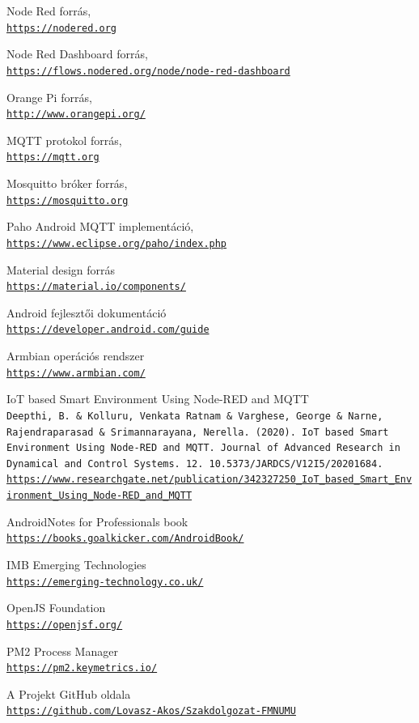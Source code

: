 \documentclass[
]{thesis-ekf}
\theoremstyle{definition}
\theoremstyle{remark}
\begin{document}
\begin{thebibliography}{2}
Node Red forrás,
\\\texttt{\url{https://nodered.org}}

Node Red Dashboard forrás,
\\\texttt{\url{https://flows.nodered.org/node/node-red-dashboard}}

Orange Pi forrás,
\\\texttt{\url{http://www.orangepi.org/}}

MQTT protokol forrás,
\\\texttt{\url{https://mqtt.org}}

Mosquitto bróker forrás,
\\\texttt{\url{https://mosquitto.org}}

Paho Android MQTT implementáció,
\\\texttt{\url{https://www.eclipse.org/paho/index.php}}

Material design forrás
\\\texttt{\url{https://material.io/components/}}

Android fejlesztői dokumentáció
\\\texttt{\url{https://developer.android.com/guide}}

Armbian operációs rendszer
\\\texttt{\url{https://www.armbian.com/}}

IoT based Smart Environment Using Node-RED and MQTT
\\\texttt{Deepthi, B. \& Kolluru, Venkata Ratnam \& Varghese, George \& Narne, Rajendraparasad \& Srimannarayana, Nerella. (2020). IoT based Smart Environment Using Node-RED and MQTT. Journal of Advanced Research in Dynamical and Control Systems. 12. 10.5373/JARDCS/V12I5/20201684.}
\\\texttt{\url{https://www.researchgate.net/publication/342327250_IoT_based_Smart_Environment_Using_Node-RED_and_MQTT}}
	
Android\texttrademark Notes for Professionals book
\\\texttt{\url{https://books.goalkicker.com/AndroidBook/}}

IMB Emerging Technologies
\\\texttt{\url{https://emerging-technology.co.uk/}}

OpenJS Foundation
\\\texttt{\url{https://openjsf.org/}}

PM2 Process Manager
\\\texttt{\url{https://pm2.keymetrics.io/}}

A Projekt GitHub oldala
\\\texttt{\url{https://github.com/Lovasz-Akos/Szakdolgozat-FMNUMU}}
\end{thebibliography}
%
\end{document}
